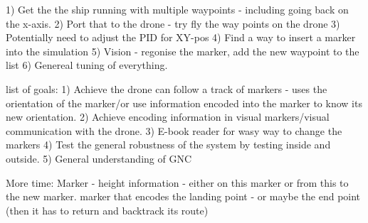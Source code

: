 

1) Get the the ship running with multiple waypoints - including going back on the x-axis. 
2) Port that to the drone - try fly the way points on the drone
3) Potentially need to adjust the PID for XY-pos 
4) Find a way to insert a marker into the simulation
5) Vision - regonise the marker, add the new waypoint to the list
6) Genereal tuning of everything. 



list of goals: 
1) Achieve the drone can follow a track of markers - uses the orientation of the marker/or use information encoded into the marker to know its new orientation.  
2) Achieve encoding information in visual markers/visual communication with  the drone.
3) E-book reader for wasy way to change the markers 
4) Test the general robustness of the system by testing inside and outside. 
5) General understanding of GNC 


More time: 
Marker - height information - either on this marker or from this to the new marker.
marker that encodes the landing point - or maybe the end point (then it has to return and backtrack its route)  
